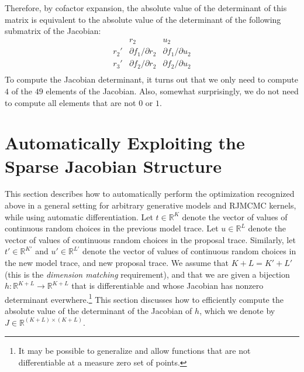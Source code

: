 \documentclass{article}
\begin{document}
Therefore, by cofactor expansion, the absolute value of the determinant of this matrix is equivalent to the absolute value of the determinant of the following submatrix of the Jacobian:
\[
\begin{array}{c|ccccccc}
&       r_2 &   u_2 \\
\hline
r_2'  & {\scriptstyle \partial f_1 / \partial r_2}   &   {\scriptstyle \partial f_1 / \partial u_2}   \\
r_3'  & {\scriptstyle \partial f_2 / \partial r_2}   &   {\scriptstyle \partial f_2 / \partial u_2}   \\
\end{array}
\]
To compute the Jacobian determinant, it turns out that we only need to compute $4$ of the $49$ elements of the Jacobian.
Also, somewhat surprisingly, we do not need to compute all elements that are not $0$ or $1$.

\section{Automatically Exploiting the Sparse Jacobian Structure}

This section describes how to automatically perform the optimization recognized above in a general setting for arbitrary generative models and RJMCMC kernels, while using automatic differentiation.
Let $t \in \mathbb{R}^K$ denote the vector of values of continuous random choices in the previous model trace.
Let $u \in \mathbb{R}^L$ denote the vector of values of continuous random choices in the proposal trace.
Similarly, let $t' \in \mathbb{R}^{K'}$ and $u' \in \mathbb{R}^{L'}$ denote the vector of values of continuous random choices in the new model trace, and new proposal trace.
We assume that $K + L = K' + L'$ (this is the \emph{dimension matching} requirement), and that we are given a bijection $h : \mathbb{R}^{K + L} \to \mathbb{R}^{K + L}$ that is differentiable and whose Jacobian has nonzero determinant everwhere.\footnote{It may be possible to generalize and allow functions that are not differentiable at a measure zero set of points.}
This section discusses how to efficiently compute the absolute value of the determinant of the Jacobian of $h$, which we denote by $J \in \mathbb{R}^{(K + L) \times (K + L)}$.
\end{document}
